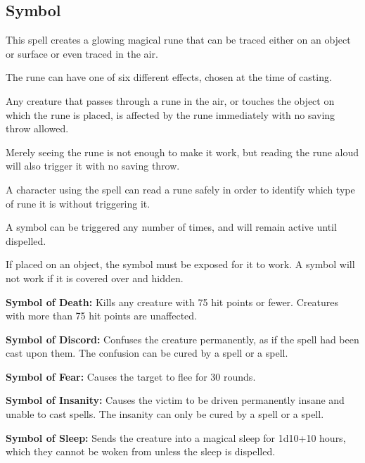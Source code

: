 \begin{multicols*}{2}
\subsection{Symbol}\label{spell:Symbol}

This spell creates a glowing magical rune that can be traced either on an object or surface or even traced in the air.

The rune can have one of six different effects, chosen at the time of casting.

Any creature that passes through a rune in the air, or touches the object on which the rune is placed, is affected by the rune immediately with no saving throw allowed.

Merely seeing the rune is not enough to make it work, but reading the rune aloud will also trigger it with no saving throw.

A character using the  spell can read a rune safely in order to identify which type of rune it is without triggering it.

A symbol can be triggered any number of times, and will remain active until dispelled.

If placed on an object, the symbol must be exposed for it to work. A symbol will not work if it is covered over and hidden.

\textbf{Symbol of Death:} Kills any creature with 75 hit points or fewer. Creatures with more than 75 hit points are unaffected.

\textbf{Symbol of Discord:} Confuses the creature permanently, as if the  spell had been cast upon them. The confusion can be cured by a  spell or a  spell.

\textbf{Symbol of Fear:} Causes the target to flee for 30 rounds.

\textbf{Symbol of Insanity:} Causes the victim to be driven permanently insane and unable to cast spells. The insanity can only be cured by a  spell or a  spell.

\textbf{Symbol of Sleep:} Sends the creature into a magical sleep for 1d10+10 hours, which they cannot be woken from unless the sleep is dispelled.


\end{multicols*}
